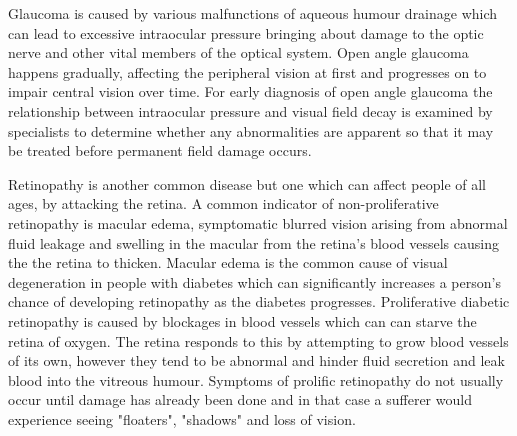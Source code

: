 Glaucoma is caused by various malfunctions of aqueous humour drainage
which can lead to excessive intraocular pressure bringing about damage
to the optic nerve and other vital members of the optical system.
\cite{distelhorst2003open} Open angle glaucoma happens gradually,
affecting the peripheral vision at first and progresses on to impair
central vision over time. For early diagnosis of open angle glaucoma
the relationship between intraocular pressure and visual field decay
is examined by specialists to determine whether any abnormalities are
apparent so that it may be treated before permanent field damage occurs.
\cite{goldmann1972open}

Retinopathy is another common disease but one which can affect people of
all ages, by attacking the retina. A common indicator of non-proliferative
retinopathy is macular edema, symptomatic blurred vision arising from
abnormal fluid leakage and swelling in the macular from the retina's
blood vessels causing the the retina to thicken.\cite{hee1995quantitative}
Macular edema is the common cause of visual degeneration in people with
diabetes which can significantly increases a person's chance of developing
retinopathy as the diabetes progresses.\cite{klein1984wisconsin} Proliferative
diabetic retinopathy is caused by blockages in blood vessels which can can
starve the retina of oxygen. The retina responds to this by attempting to
grow blood vessels of its own, however they tend to be abnormal and hinder
fluid secretion and leak blood into the vitreous humour. Symptoms of
prolific retinopathy do not usually occur until damage has already been
done and in that case a sufferer would experience seeing "floaters",
"shadows" and loss of vision.


